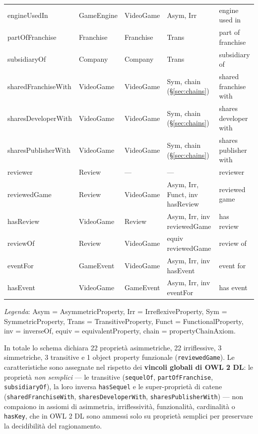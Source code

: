 \begin{longtable}{lllll}
engineUsedIn       & GameEngine& VideoGame   & Asym, Irr                             & engine used in \\
partOfFranchise    & Franchise & Franchise   & Trans                                 & part of franchise \\
subsidiaryOf       & Company   & Company     & Trans                                 & subsidiary of \\
sharedFranchiseWith& VideoGame & VideoGame   & Sym, chain (\S\ref{sec:chains}) & shared franchise with \\
sharesDeveloperWith& VideoGame & VideoGame   & Sym, chain (\S\ref{sec:chains}) & shares developer with \\
sharesPublisherWith& VideoGame & VideoGame   & Sym, chain (\S\ref{sec:chains}) & shares publisher with \\
reviewer           & Review    & ---         & ---                                   & reviewer \\
reviewedGame       & Review    & VideoGame   & Asym, Irr, Funct, inv hasReview       & reviewed game \\
hasReview          & VideoGame & Review      & Asym, Irr, inv reviewedGame           & has review \\
reviewOf           & Review    & VideoGame   & equiv reviewedGame                    & review of \\
eventFor           & GameEvent & VideoGame   & Asym, Irr, inv hasEvent               & event for \\
hasEvent           & VideoGame & GameEvent   & Asym, Irr, inv eventFor               & has event \\
\bottomrule
\end{longtable}
\endgroup

\textit{Legenda}: Asym = AsymmetricProperty, Irr = IrreflexiveProperty,
Sym = SymmetricProperty, Trans = TransitiveProperty, Funct = FunctionalProperty,
inv = inverseOf, equiv = equivalentProperty, chain = propertyChainAxiom.

In totale lo schema dichiara 22 propriet\`a asimmetriche, 22 irriflessive, 3 simmetriche,
3 transitive e 1 object property funzionale (\texttt{reviewedGame}).
Le caratteristiche sono assegnate nel rispetto dei \textbf{vincoli globali di OWL 2 DL}:
le propriet\`a \emph{non semplici} --- le transitive (\texttt{sequelOf},
\texttt{partOfFranchise}, \texttt{subsidiaryOf}), la loro inversa \texttt{hasSequel}
e le super-propriet\`a di catene (\texttt{sharedFranchiseWith}, \texttt{sharesDeveloperWith},
\texttt{sharesPublisherWith}) --- non compaiono in assiomi di asimmetria, irriflessivit\`a,
funzionalit\`a, cardinalit\`a o \texttt{hasKey}, che in OWL 2 DL sono ammessi solo su
propriet\`a semplici per preservare la decidibilit\`a del ragionamento.

